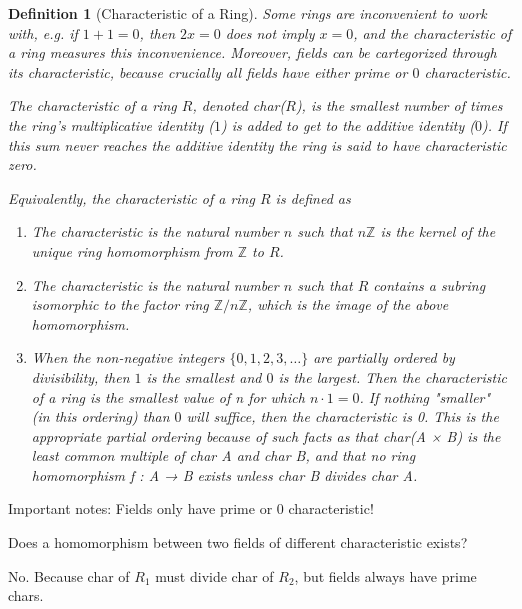 \documentclass{book}
\theoremstyle{custom_definition}
\newtheorem{definition}{Definition}
\begin{document}
    \begin{definition}[Characteristic of a Ring]
        \textit{Some rings are inconvenient to work with, e.g. if \(1 + 1 = 0\), then \(2x = 0\) does not imply \(x = 0\), and the characteristic of a ring measures this inconvenience. Moreover, fields can be cartegorized through its characteristic, because crucially all fields have either prime or \(0\) characteristic.}
        \vspace{3pt}

        \noindent The characteristic of a ring \(R\), denoted char(\(R\)), is the smallest number of times the ring's multiplicative identity (\(1\)) is added to get to the additive identity (\(0\)). If this sum never reaches the additive identity the ring is said to have characteristic zero.

        Equivalently, the characteristic of a ring \(R\) is defined as
        \begin{enumerate}
            \item The characteristic is the natural number \(n\) such that \(n\mathbb{Z}\) is the kernel of the unique ring homomorphism from \(\mathbb{Z}\) to \(R\).
            \item The characteristic is the natural number \(n\) such that \(R\) contains a subring isomorphic to the factor ring \(\mathbb{Z}/n\mathbb{Z}\), which is the image of the above homomorphism.
            \item When the non-negative integers \(\{0, 1, 2, 3, \ldots \}\) are partially ordered by divisibility, then \(1\) is the smallest and \(0\) is the largest. Then the characteristic of a ring is the smallest value of n for which \(n \cdot 1 = 0\). If nothing "smaller" (in this ordering) than \(0\) will suffice, then the characteristic is 0. This is the appropriate partial ordering because of such facts as that char(A × B) is the least common multiple of char A and char B, and that no ring homomorphism f : A → B exists unless char B divides char A.
        \end{enumerate}
    \end{definition}
    Important notes: Fields only have prime or 0 characteristic!
    \begin{Exercise}
        Does a homomorphism between two fields of different characteristic exists?
    \end{Exercise}
    \begin{Answer}
        No. Because char of \(R_1\) must divide char of \(R_2\), but fields always have prime chars.
    \end{Answer}
\end{document}
